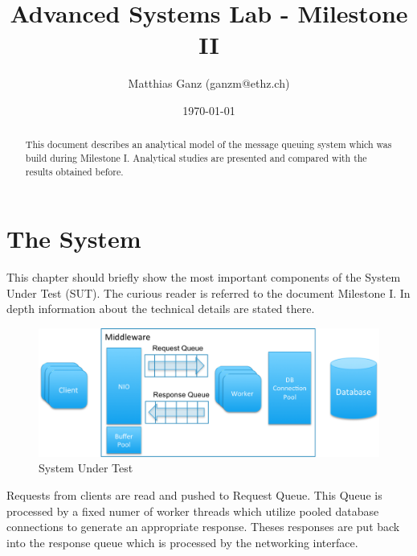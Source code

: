 \documentclass[a4paper]{article}
\title{Advanced Systems Lab - Milestone II}
\author{Matthias Ganz (ganzm@ethz.ch)}
\date{\today}
\begin{document}
\maketitle

\pagebreak

\tableofcontents

\pagebreak

\begin{abstract}

This document describes an analytical model of the message queuing system which was build during Milestone I. Analytical studies are presented and compared with the results obtained before.


\end{abstract}

\pagebreak

\section{The System}

This chapter should briefly show the most important components of the System Under Test (SUT). The curious reader is referred to the document Milestone I. In depth information about the technical details are stated there.



\begin{figure}[H]
	\begin{center}
    \includegraphics[scale=0.4]{../drawings/broker-threading.png}
  \end{center}
  \caption{System Under Test}
  \label{fig:sut}
\end{figure}


Requests from clients are read and pushed to Request Queue. This Queue is processed by a fixed numer of worker threads which utilize pooled database connections to generate an appropriate response. Theses responses are put back into the response queue which is processed by the networking interface.
\end{document}
